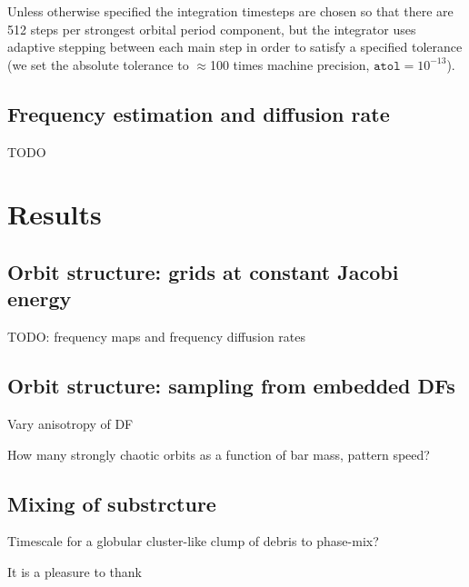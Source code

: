 \documentclass[modern]{aastex61}
\begin{document}
Unless otherwise specified the integration timesteps are
chosen so that there are 512 steps per strongest orbital period component, but
the integrator uses adaptive stepping between each main step in order to satisfy
a specified tolerance (we set the absolute tolerance to $\approx$100 times
machine precision, $\texttt{atol} = 10^{-13}$).

\subsection{Frequency estimation and diffusion rate} \label{sec:freqdiff}

TODO

\section{Results} \label{sec:results}

\subsection{Orbit structure: grids at constant Jacobi energy}

TODO: frequency maps and frequency diffusion rates

\subsection{Orbit structure: sampling from embedded DFs}

Vary anisotropy of DF

How many strongly chaotic orbits as a function of bar mass, pattern speed?

\subsection{Mixing of substrcture}

Timescale for a globular cluster-like clump of debris to phase-mix?

\acknowledgements

It is a pleasure to thank

\end{document}

